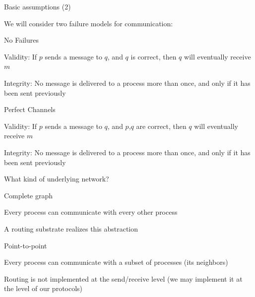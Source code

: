 \begin{frame}{Basic assumptions (2)}
	
We will consider two failure models for communication:

\bigskip
\begin{block}{No Failures}
\BIL
\item \alert{Validity}: If $p$ sends a message to $q$, and $q$ is correct, then $q$ will eventually receive $m$
\item \alert{Integrity}: No message is delivered to a process more than once, and only if it has been sent previously
\EIL
\end{block}

\bigskip
\begin{block}{Perfect Channels}
\BIL
\item \alert{Validity}: If $p$ sends a message to $q$, and $p$,$q$ are correct, then $q$ will eventually receive $m$
\item \alert{Integrity}: No message is delivered to a process more than once, and only if it has been sent previously
\EIL
\end{block}

\end{frame}

\begin{frame}{What kind of underlying network?}

\BIL

\item \alert{Complete graph}
\BI
\item Every process can communicate with every other process
\item A routing substrate realizes this abstraction
\EI

\item \alert{Point-to-point}
\BI
\item Every process can communicate with a subset of processes 
(its neighbors)
\item Routing is not implemented at the send/receive level 
(we may implement it at the level of our protocols)
\EI

\EIL

\end{frame}


